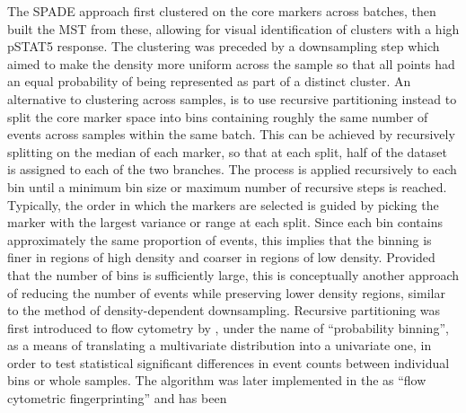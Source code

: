 The \gls{SPADE} approach first clustered on the core markers across batches,
then built the \gls{MST} from these, allowing for visual identification of
clusters with a high pSTAT5 response.
The clustering was preceded by a downsampling step which aimed to make the density
more uniform across the sample so that all points had an equal probability of being
represented as part of a distinct cluster.  
An alternative to clustering across samples, is to use recursive partitioning instead to split the core marker space into bins containing roughly the same number of
events across samples within the same batch.
This can be achieved by recursively splitting on the median of each marker, so that at each split, half of the dataset is assigned to each of the two branches.
The process is applied recursively to each bin until a minimum bin size or maximum number of recursive steps is reached.  
Typically, the order in which the markers are selected is guided by picking the marker
with the largest variance or range at each split.
Since each bin contains approximately the same proportion of events,
this implies that the binning is finer in regions of high density and coarser in regions of low density.
Provided that the number of bins is sufficiently large, this is conceptually another approach of reducing the number of events while preserving lower density regions, similar to the method of density-dependent downsampling.
Recursive partitioning was first introduced to flow cytometry by \citet{Roederer:2001tz},
under the name of ``probability binning'', as a means of translating a multivariate distribution into a univariate one,
in order to test statistical significant differences in event counts between individual bins or whole samples.
The algorithm was later implemented in the  as ``flow cytometric fingerprinting'' and has been
